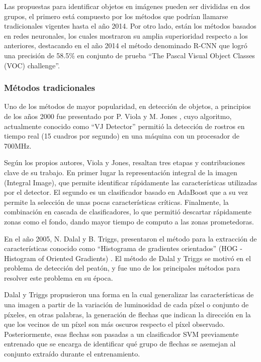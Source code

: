         Las propuestas para identificar objetos en imágenes pueden ser divididas en dos grupos, el primero está compuesto por los métodos que podrían llamarse tradicionales vigentes hasta el año 2014. Por otro lado, están los métodos basados en redes neuronales, los cuales mostraron su amplia superioridad respecto a los anteriores, destacando en el año 2014 el método denominado R-CNN \cite{Girshick2014} que logró una precisión de 58.5\% en conjunto de prueba ``The Pascal Visual Object Classes (VOC) challenge''\cite{VOC2010}.
        
        \subsubsection{Métodos tradicionales}
        \label{Sub2:FrameObjectDetectionTraditional}
            Uno de los métodos de mayor popularidad, en detección de objetos, a principios de los años 2000 fue presentado por P. Viola y M. Jones \cite{Viola2001, Viola2004}, cuyo algoritmo, actualmente conocido como ``VJ Detector'' permitió la detección de rostros en tiempo real (15 cuadros por segundo) en una máquina con un procesador de 700MHz. 
            
            Según los propios autores, Viola y Jones, resaltan tres etapas y contribuciones clave de su trabajo. En primer lugar la representación integral de la imagen (Integral Image), que permite identificar rápidamente las características utilizadas por el detector. El segundo es un clasificador basado en AdaBoost  que a su vez permite la selección de unas pocas características críticas. Finalmente, la combinación en cascada de clasificadores, lo que permitió descartar rápidamente zonas como el fondo, dando mayor tiempo de computo a las zonas prometedoras.
            
            En el año 2005, N. Dalal y B. Triggs, presentaron el método para la extracción de características conocido como ``Histograma de gradientes orientados'' (HOG - Histogram of Oriented Gradients) \cite{Dalal2005}. El método de Dalal y Triggs se motivó en el problema de detección del peatón, y fue uno de los principales métodos para resolver este problema en su época.
            
            Dalal y Triggs propusieron una forma en la cual generalizar las características de una imagen a partir de la variación de luminosidad de cada píxel o conjunto de píxeles, en otras palabras, la generación de flechas que indican la dirección en la que los vecinos de un píxel son más oscuros respecto el píxel observado. Posteriormente, esas flechas son pasadas a un clasificador SVM previamente entrenado que se encarga de identificar qué grupo de flechas se asemejan al conjunto extraído durante el entrenamiento.
            
